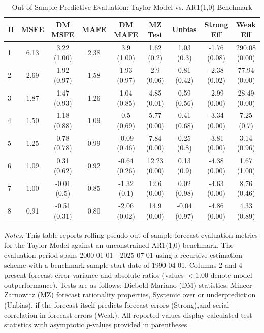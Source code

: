 \begin{table}[htbp]
\centering
\caption{Out-of-Sample Predictive Evaluation: Taylor Model vs. AR1(1,0) Benchmark}
\label{tab:taylor_model_evaluation}
\footnotesize
\begin{tabular}{l cccccccc}
\hline\hline
\rule{0pt}{3ex}
\textbf{H} & \textbf{MSFE} & \textbf{DM MSFE} & \textbf{MAFE} & \textbf{DM MAFE} & \textbf{MZ Test} & \textbf{Unbias} & \textbf{Strong Eff} & \textbf{Weak Eff} \\[0.5ex]
\hline
\rule{0pt}{2.5ex}
1 & 6.13 & 3.22 (1.00) & 2.38 & 3.9 (1.00) & 1.62 (0.2) & 1.03 (0.3) & -1.76 (0.08) & 290.08 (0.00) \\
2 & 2.69 & 1.92 (0.97) & 1.58 & 1.93 (0.97) & 2.9 (0.06) & 0.81 (0.42) & -2.38 (0.02) & 77.94 (0.00) \\
3 & 1.87 & 1.47 (0.93) & 1.26 & 1.04 (0.85) & 4.85 (0.01) & 0.59 (0.56) & -2.99 (0.00) & 28.49 (0.00) \\
4 & 1.50 & 1.18 (0.88) & 1.09 & 0.5 (0.69) & 5.77 (0.00) & 0.41 (0.68) & -3.34 (0.00) & 7.25 (0.7) \\
5 & 1.25 & 0.78 (0.78) & 0.99 & -0.09 (0.46) & 7.84 (0.00) & 0.25 (0.8) & -3.81 (0.00) & 3.14 (0.96) \\
6 & 1.09 & 0.31 (0.62) & 0.92 & -0.64 (0.26) & 12.23 (0.00) & 0.13 (0.9) & -4.38 (0.00) & 1.67 (1.00) \\
7 & 1.00 & -0.01 (0.5) & 0.85 & -1.32 (0.1) & 12.6 (0.00) & 0.02 (0.98) & -4.63 (0.00) & 8.76 (0.46) \\
8 & 0.91 & -0.51 (0.31) & 0.80 & -2.06 (0.02) & 14.9 (0.00) & -0.04 (0.97) & -4.86 (0.00) & 4.33 (0.89) \\
\hline\hline
\end{tabular}%
\par\smallskip
\parbox{\textwidth}{\scriptsize \textit{Notes:} This table reports rolling pseudo-out-of-sample forecast evaluation metrics for the Taylor Model against an unconstrained AR1(1,0) benchmark. The evaluation period spans 2000-01-01 - 2025-07-01 using a recursive estimation scheme with a benchmark sample start date of 1990-04-01. Columns 2 and 4 present forecast error variance and absolute ratios (values $< 1.00$ denote model outperformance). Tests are as follows: Diebold-Mariano (DM) statistics, Mincer-Zarnowitz (MZ) forecast rationality properties, Systemic over or underprediction (Unbias), if the forecast itself predicts forecast errors (Strong),and serial correlation in forecast errors (Weak). All reported values display calculated test statistics with asymptotic $p$-values provided in parentheses.}
\end{table}
